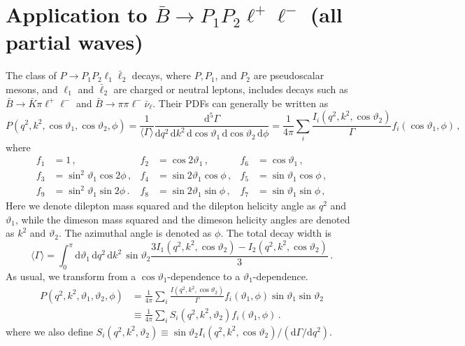 \documentclass[aps,prd,reprint,nofootinbib,preprintnumbers]{revtex4}
\newcommand{\dd}{\text{d}}
\renewcommand{\theta}{\vartheta}
\begin{document}
\section{Application to $\bar{B}\to P_1 P_2\ell^+\ell^-$ (all partial waves)}
\label{app:btokpill}

The class of $P\to P_1 P_2 \ell_1\bar\ell_2$ decays, where $P,P_1$, and $P_2$ are pseudoscalar mesons,
and $\ell_1$ and $\bar\ell_2$ are charged or neutral leptons, includes decays
such as $\bar{B}\to\bar{K}\pi\ell^+\ell^-$ and $\bar{B}\to \pi\pi\ell^-\bar\nu_\ell$.
Their PDFs can generally be written as \cite{Lee:1992ih}
\begin{equation}
    P(q^2, k^2, \cos\theta_1, \cos \theta_2, \phi) = \frac{1}{\langle \Gamma\rangle}\frac{\dd^5 \Gamma}{\dd q^2\,\dd k^2\, \dd\cos\theta_1\,\dd\cos\theta_2\,\dd\phi} = \frac{1}{4\pi} \sum_i \frac{I_i(q^2, k^2, \cos\theta_2)}{\Gamma} f_i(\cos\theta_1,\phi)\,,
\end{equation}
where
\begin{equation}
\begin{aligned}
    f_1 & = 1\,,              &
    f_2 & = \cos 2\theta_1\,, &
    f_6 & = \cos  \theta_1\,, \\
    f_3 & = \sin^2\theta_1 \cos 2\phi\,,&
    f_4 & = \sin 2\theta_1 \cos  \phi\,,&
    f_5 & = \sin  \theta_1 \cos  \phi\,,\\
    f_9 & = \sin^2\theta_1 \sin 2\phi\,.&
    f_8 & = \sin 2\theta_1 \sin  \phi\,,&
    f_7 & = \sin  \theta_1 \sin  \phi\,,
\end{aligned}
\end{equation}
Here we denote dilepton mass squared and the dilepton helicity angle as $q^2$ and $\theta_1$, while
the dimeson mass squared and the dimeson helicity angles are denoted as $k^2$ and $\theta_2$. The
azimuthal angle is denoted as $\phi$. The total decay width is
\begin{equation}
    \langle \Gamma\rangle = \int_0^\pi \dd\theta_1\,\dd q^2\,\dd k^2\,\sin\theta_2 \frac{3I_1(q^2, k^2, \cos\theta_2) - I_2(q^2, k^2, \cos\theta_2)}{3}\,.
\end{equation}
As usual, we transform from a $\cos\theta_1$-dependence to a $\theta_1$-dependence.
\begin{equation}
\begin{aligned}
    P(q^2, k^2, \theta_1, \theta_2, \phi)
    & = \frac{1}{4\pi} \sum_i \frac{I(q^2, k^2, \cos\theta_2)}{\Gamma} f_i(\theta_1, \phi) \sin\theta_1 \sin\theta_2\\
    & \equiv \frac{1}{4\pi} \sum_i S_i(q^2, k^2, \theta_2) f_i(\theta_1, \phi)\,.
\end{aligned}
\end{equation}
where we also define $S_i(q^2, k^2, \theta_2) \equiv \sin\theta_2 I_i(q^2, k^2, \cos\theta_2) / (\dd\Gamma/\dd q^2)$.\\
\end{document}
